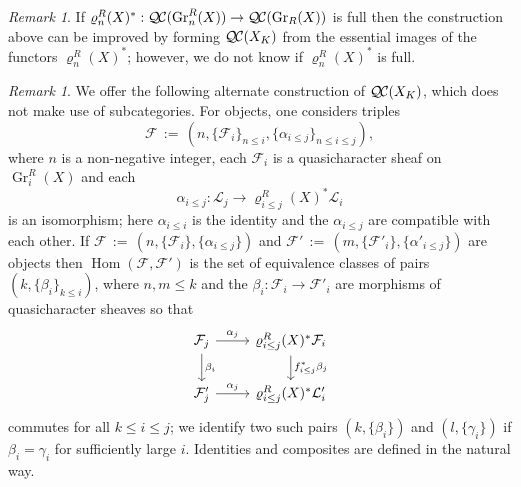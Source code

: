 \documentclass[CM,Submssn,SecEq]{degruyter-crelle} %
\theoremstyle{plain}
\theoremstyle{definition}
\theoremstyle{remark}
\newtheorem{remark}[theorem]{Remark}
\DeclareMathOperator{\Hom}{Hom}
\DeclareMathOperator{\Gr}{Gr}
\newcommand{\ceq}{{\, :=\, }}
\newcommand{\qcs}[1]{{\mathcal{#1}}}
\newcommand{\QC}{{\mathcal{Q\hskip-0.8pt C}}}
\begin{document}
\begin{remark}
If $\varrho^R_n(X)^* : \QC(\Gr^R_n(X)) \to \QC(\Gr_R(X))$ is full then the construction above can be improved by forming $\QC(X_K)$ from the essential images of the functors $\varrho^R_n(X)^*$; however, we do not know if $\varrho^R_n(X)^*$ is full.
\end{remark}

\begin{remark}
We offer the following alternate construction of $\QC(X_K)$, which does not make use of subcategories.
For objects, one considers triples 
\[
\qcs{F} \ceq (n, \{\qcs{F}_i\}_{n\leq i}, \{\alpha_{i \le j}\}_{n\le i \le j}),
\] where $n$
is a non-negative integer, each $\qcs{F}_i$ is a quasicharacter sheaf on $\Gr^R_i(X)$ and each 
\[
\alpha_{i \le j} : \qcs{L}_j \to \varrho^R_{i \le j}(X)^* \qcs{L}_i
\]
 is an isomorphism; here $\alpha_{i \le i}$ is the identity and the $\alpha_{i \le j}$ are compatible with each other.  
If $\qcs{F} \ceq (n, \{\qcs{F}_i\}, \{\alpha_{i \le j}\})$
and $\qcs{F}' \ceq (m, \{\qcs{F}'_i\}, \{\alpha'_{i \le j}\})$ are objects then $\Hom(\qcs{F}, \qcs{F}')$ is the set
of equivalence classes of pairs $(k, \{\beta_i\}_{k \le i})$, where $n,m \le k$ and the $\beta_i : \qcs{F}_i \to \qcs{F}'_i$ are
morphisms of quasicharacter sheaves so that
\[
\begin{tikzcd}
\qcs{F}_j \rar{\alpha_j} \dar{\beta_i} & \varrho^R_{i \le j}(X)^* \qcs{F}_i \dar{f_{i \le j}^*\beta_j} \\
\qcs{F}'_j \rar{\alpha_j} & \varrho^R_{i \le j}(X)^* \qcs{L}'_i
\end{tikzcd}
\]
commutes for all $k\le i\le j$; we identify two such pairs $(k, \{\beta_i\})$ and $(l, \{\gamma_i\})$ if $\beta_i = \gamma_i$
for sufficiently large $i$.  Identities and composites are defined in the natural way.
\end{remark}
\end{document}
